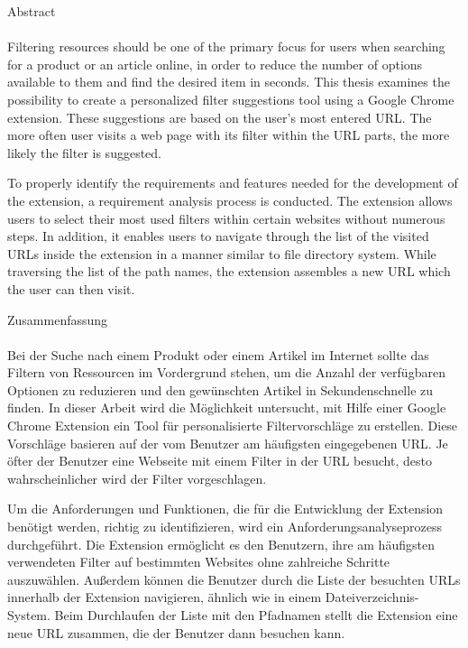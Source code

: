 \newpage
\thispagestyle{empty}
\vspace*{2.2cm}
\noindent %
{\Huge Abstract}\\
\vspace*{1.6cm} \\

\pagestyle{headings}
Filtering resources should be one of the primary focus for users when searching for a product or an article online, in order to reduce the number of options available to them and find the desired item in seconds. This thesis examines the possibility to create a personalized filter suggestions tool using a Google Chrome extension. These suggestions are based on the user's most entered URL. The more often user visits a web page with its filter within the URL parts, the more likely the filter is suggested.

To properly identify the requirements and features needed for the development of the extension, a requirement analysis process is conducted. The extension allows users to select their most used filters within certain websites without numerous steps. In addition, it enables users to navigate through the list of the visited URLs inside the extension in a manner similar to file directory system. While traversing the list of the path names, the extension assembles a new URL which the user can then visit.

\newpage
\thispagestyle{empty}
\vspace*{2.2cm}
\noindent %
{\Huge Zusammenfassung}\\
\vspace*{1.6cm} \\

\pagestyle{headings}
Bei der Suche nach einem Produkt oder einem Artikel im Internet sollte das Filtern von Ressourcen im Vordergrund stehen, um die Anzahl der verf\"ugbaren Optionen zu reduzieren und den gew\"unschten Artikel in Sekundenschnelle zu finden. In dieser Arbeit wird die M\"oglichkeit untersucht, mit Hilfe einer Google Chrome Extension ein Tool f\"ur personalisierte Filtervorschl\"age zu erstellen. Diese Vorschl\"age basieren auf der vom Benutzer am h\"aufigsten eingegebenen URL. Je \"ofter der Benutzer eine Webseite mit einem Filter in der URL besucht, desto wahrscheinlicher wird der Filter vorgeschlagen.

Um die Anforderungen und Funktionen, die f\"ur die Entwicklung der Extension ben\"otigt werden, richtig zu identifizieren, wird ein Anforderungsanalyseprozess durchgef\"uhrt. Die Extension erm\"oglicht es den Benutzern, ihre am h\"aufigsten verwendeten Filter auf bestimmten Websites ohne zahlreiche Schritte auszuw\"ahlen. Au{\ss}erdem k\"onnen die Benutzer durch die Liste der besuchten URLs innerhalb der Extension navigieren, \"ahnlich wie in einem Dateiverzeichnis-System. Beim Durchlaufen der Liste mit den Pfadnamen stellt die Extension eine neue URL zusammen, die der Benutzer dann besuchen kann.
